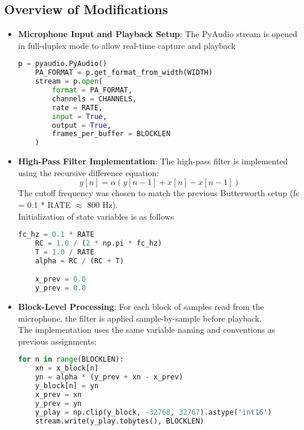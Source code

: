 \documentclass[11pt]{article}
\begin{document}
\subsection*{Overview of Modifications}
\begin{itemize}
    \item \textbf{Microphone Input and Playback Setup}: The PyAudio stream is opened in full-duplex mode to allow real-time capture and playback
    
    \begin{lstlisting}[language=python, label={lst:code}, breaklines=true]
    p = pyaudio.PyAudio()
    PA_FORMAT = p.get_format_from_width(WIDTH)
    stream = p.open(
        format = PA_FORMAT,
        channels = CHANNELS,
        rate = RATE,
        input = True,
        output = True,
        frames_per_buffer = BLOCKLEN
    )
    \end{lstlisting}    

    \item \textbf{High-Pass Filter Implementation}: The high-pass filter is implemented using the recursive difference equation:
    $$
    y[n] = \alpha \left( y[n - 1] + x[n] - x[n - 1] \right)
    $$
    The cutoff frequency was chosen to match the previous Butterworth setup (fc = 0.1 * RATE $\approx$ 800 Hz).\\
    Initialization of state variables is as follows
    
    
    \begin{lstlisting}[language=python, label={lst:code}, breaklines=true, caption={Filter Initialization}]
    fc_hz = 0.1 * RATE
    RC = 1.0 / (2 * np.pi * fc_hz)
    T = 1.0 / RATE
    alpha = RC / (RC + T)

    x_prev = 0.0
    y_prev = 0.0
    \end{lstlisting}    
    
    
    \item \textbf{Block-Level Processing}: For each block of samples read from the microphone, the filter is applied sample-by-sample before playback.\\
    The implementation uses the same variable naming and conventions as previous assignments:
    
    \begin{lstlisting}[language=python, label={lst:code}, breaklines=true, caption={Recursive Block-Level Filter Application}]
    for n in range(BLOCKLEN):
    xn = x_block[n]
    yn = alpha * (y_prev + xn - x_prev)
    y_block[n] = yn
    x_prev = xn
    y_prev = yn
    y_play = np.clip(y_block, -32768, 32767).astype('int16')
    stream.write(y_play.tobytes(), BLOCKLEN)
    \end{lstlisting}    


\end{itemize}
\end{document}
